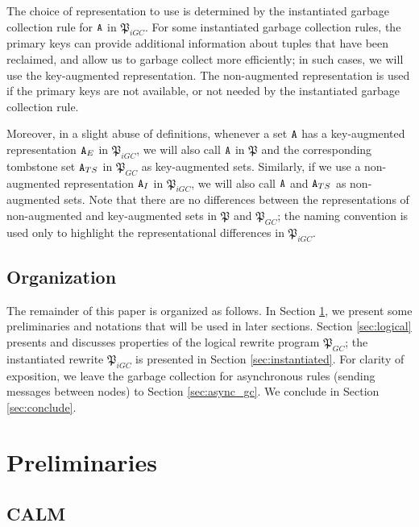 \documentclass{article}
\numberwithin{equation}{section}
\renewcommand{\tt}[1]{\ifmmode\text{\texttt{#1}}\else\texttt{#1}\fi}
\begin{document}
The choice of representation to use is determined by the instantiated garbage collection rule for $\tt{A}$ in $\mathfrak{P}_{iGC}$.
For some instantiated garbage collection rules, the primary keys can provide additional information about tuples that have been reclaimed, and allow us to garbage collect more efficiently;
in such cases, we will use the key-augmented representation.
The non-augmented representation is used if the primary keys are not available, or not needed by the instantiated garbage collection rule.

Moreover, in a slight abuse of definitions, whenever a set $\tt{A}$ has a key-augmented representation $\tt{A}_E$ in $\mathfrak{P}_{iGC}$, we will also call $\tt{A}$ in $\mathfrak{P}$ and the corresponding tombstone set $\tt{A}_{TS}$ in $\mathfrak{P}_{GC}$ as key-augmented sets.
Similarly, if we use a non-augmented representation $\tt{A}_I$ in $\mathfrak{P}_{iGC}$, we will also call $\tt{A}$ and $\tt{A}_{TS}$ as non-augmented sets.
Note that there are no differences between the representations of non-augmented and key-augmented sets in $\mathfrak{P}$ and $\mathfrak{P}_{GC}$;
the naming convention is used only to highlight the representational differences in $\mathfrak{P}_{iGC}$.



\subsection{Organization}
The remainder of this paper is organized as follows.
In Section \ref{sec:prelims}, we present some preliminaries and notations that will be used in later sections.
Section \ref{sec:logical} presents and discusses properties of the logical rewrite program $\mathfrak{P}_{GC}$;
the instantiated rewrite $\mathfrak{P}_{iGC}$ is presented in Section \ref{sec:instantiated}.
For clarity of exposition, we leave the garbage collection for asynchronous rules (sending messages between nodes) to Section \ref{sec:async_gc}.
We conclude in Section \ref{sec:conclude}.




\section{Preliminaries}
\label{sec:prelims}
\subsection{CALM}
\end{document}
